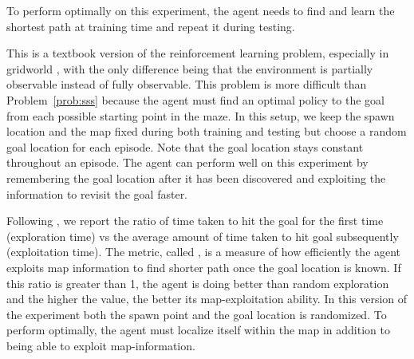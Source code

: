 \begin{description}
  \label{prob:sss}
  To perform optimally on this experiment, the agent needs to find and learn the shortest path at training time and repeat it during testing. 

  This is a textbook version of the reinforcement learning problem, especially in gridworld \cite{SuBaBOOK1998}, with the only difference being that the environment is partially observable instead of fully observable.
  This problem is more difficult than Problem~\ref{prob:sss} because the agent
  must find an optimal policy to the goal from each possible starting point in the maze.
  In this setup, we keep the spawn location and the map fixed during both training and testing but choose a random goal location for each episode.
  Note that the goal location stays constant throughout an episode.
  The agent can perform well on this experiment by remembering the goal location after it has been discovered and exploiting the information to revisit the goal faster.  
  
  Following \cite{MiPaViICLR2017}, we report the ratio
  of time taken to hit the goal for the first time (exploration time) vs the average amount of time taken to hit goal subsequently (exploitation time). The metric, called \emph{\LatencyOneGtOne{}}, is a measure of how efficiently the agent exploits map information to find shorter path once the goal location is known. 
  If this ratio is greater than 1, the agent is doing better than random exploration and the higher the value, the better its map-exploitation ability.
  In this version of the experiment both the spawn point and the goal location is randomized. To perform optimally, the agent must localize itself within the map in addition to being able to exploit map-information.
  

\end{description}
